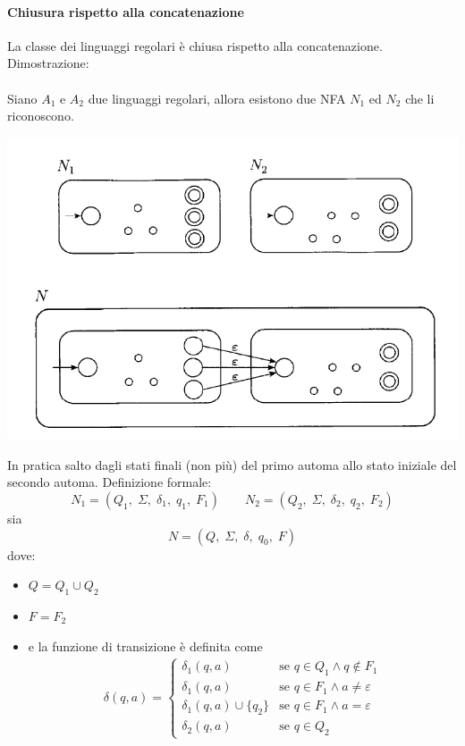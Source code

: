 \documentclass[italian]{article}
\begin{document}
\paragraph{Chiusura rispetto alla concatenazione}
La classe dei linguaggi regolari è chiusa rispetto alla concatenazione. Dimostrazione: \\\\
Siano $A_1$ e $A_2$ due linguaggi regolari, allora esistono due NFA $N_1$ ed $N_2$ che li riconoscono.
\begin{center}
	\includegraphics[width=0.7\linewidth]{images/nfa_concat}
\end{center}
In pratica salto dagli stati finali (non più) del primo automa allo stato iniziale del secondo automa. Definizione formale:
\[
	N_1 = (Q_1,\;\Sigma,\;\delta_1,\;q_1,\;F_1) \qquad N_2 = (Q_2,\;\Sigma,\;\delta_2,\;q_2,\;F_2)
\]
sia 
\[
	N = (Q,\;\Sigma,\;\delta,\;q_0,\;F)
\]
dove:
\begin{itemize}
	\item $Q = Q_1 \cup Q_2$
	\item $F = F_2$
	\item e la funzione di transizione è definita come
		\begin{align*}
			\delta(q,a) = 
			\begin{cases}
				\delta_1(q,a) & \text{se } q \in Q_1 \land q \notin F_1 \\
				\delta_1(q,a) & \text{se } q \in F_1 \land a \neq \varepsilon \\
				\delta_1(q,a) \cup \{q_2\} & \text{se } q \in F_1 \land a = \varepsilon\\
				\delta_2(q,a) & \text{se } q \in Q_2 
			\end{cases}
		\end{align*}
\end{itemize}
\pagebreak
\end{document}
